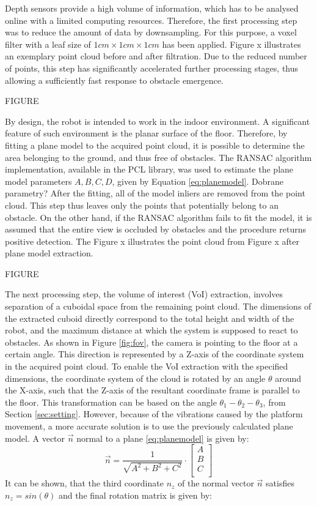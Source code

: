 Depth sensors provide a high volume of information, which has to be analysed online with a limited computing resources. Therefore, the first processing step was to reduce the amount of data by downsampling. For this purpose, a voxel filter with a leaf size of $1cm \times 1cm \times 1cm$ has been applied. Figure x illustrates an exemplary point cloud before and after filtration. Due to the reduced number of points, this step has significantly accelerated further processing stages, thus allowing a sufficiently fast response to obstacle emergence.

FIGURE

By design, the robot is intended to work in the indoor environment. A significant feature of such environment is the planar surface of the floor. Therefore, by fitting a plane model to the acquired point cloud, it is possible to determine the  area belonging to the ground, and thus free of obstacles. The RANSAC algorithm implementation, available in the PCL library, was used to estimate the plane model parameters $A,B,C,D$, given by Equation \ref{eq:planemodel}. Dobrane parametry? After the fitting, all of the model inliers are removed from the point cloud. This step thus leaves only the points that potentially belong to an obstacle. On the other hand, if the RANSAC algorithm fails to fit the model, it is assumed that the entire view is occluded by obstacles and the procedure returns positive detection.  The Figure x illustrates the point cloud from Figure x after plane model extraction.

FIGURE

The next processing step, the volume of interest (VoI) extraction, involves separation of a cuboidal space from the remaining point cloud. The dimensions of the extracted cuboid directly correspond to the total height and width of the robot, and the maximum distance at which the system is supposed to react to obstacles. As shown in Figure \ref{fig:fov}, the camera is pointing to the floor at a certain angle. This direction is represented by a Z-axis of the coordinate system in the acquired point cloud. To enable the VoI extraction with the specified dimensions, the coordinate system of the cloud is rotated by an angle $\theta$ around the X-axis, such that the Z-axis of the resultant coordinate frame is parallel to the floor. This transformation can be based on the angle $\theta_1 - \theta_2 - \theta_3$, from Section \ref{sec:setting}. However, because of the vibrations caused by the platform movement, a more accurate solution is to use the previously calculated plane model. A vector $\vec{n}$ normal to a plane \ref{eq:planemodel} is given by:
\begin{equation}
 \vec{n} = \frac{1}{\sqrt{A^2+B^2+C^2}} \cdot \left[
\begin{array}{c}
A\\
B\\
C\\
\end{array}
\right] 
\end{equation}
It can be shown, that the third coordinate $n_z$ of the normal vector $\vec{n}$ satisfies $n_z = sin(\theta)$ and the final rotation matrix is given by:

